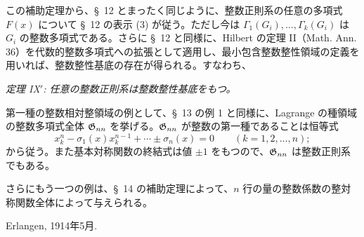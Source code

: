 \documentclass[11pt]{jlreq}
\begin{document}
この補助定理から、\S\ 12 とまったく同じように、整数正則系の任意の多項式 $F(x)$ について \S\ 12 の表示 (3) が従う。ただし今は $\Gamma_1(G_i),\ldots,\Gamma_k(G_i)$ は $G_i$ の整数多項式である。さらに \S\ 12 と同様に、Hilbert の定理 II（Math. Ann. 36）を代数的整数多項式への拡張として適用し、最小包含整数整性領域の定義を用いれば、整数整性基底の存在が得られる。すなわち、

\emph{定理 IX$'$: 任意の整数正則系は整数整性基底をもつ。}

第一種の整数相対整領域の例として、\S\ 13 の例 1 と同様に、Lagrange の種領域の整数多項式全体 $\mathfrak{G}_{nn}$ を挙げる。$\mathfrak{G}_{nn}$ が整数の第一種であることは恒等式
\[
  x_k^n-\sigma_1(x)x_k^{n-1}+\cdots\pm\sigma_n(x)=0
  \qquad(k=1,2,
\ldots,n);
\]
から従う。また基本対称関数の終結式は値 $\pm1$ をもつので、$\mathfrak{G}_{nn}$ は整数正則系でもある。

さらにもう一つの例は、\S\ 14 の補助定理によって、$n$ 行の量の整数係数の整対称関数全体によって与えられる。

Erlangen, 1914年5月.
\end{document}
